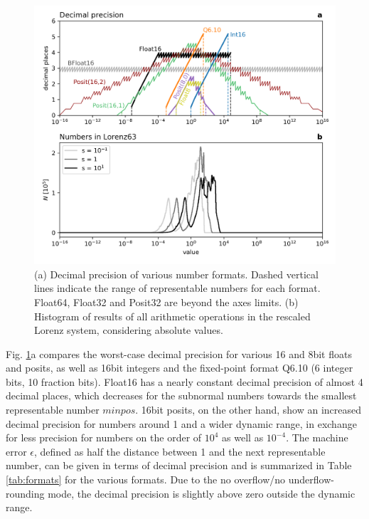 \documentclass[draft]{agujournal2019}
\begin{document}
\begin{figure}[htbp]
\includegraphics[width=1\textwidth]{../plots/decimal_precision.png}
\caption{(a) Decimal precision of various number formats. Dashed vertical lines indicate the range of representable numbers for each format. Float64, Float32 and Posit32 are beyond the axes limits. (b) Histogram of results of all arithmetic operations in the rescaled Lorenz system, considering absolute values.}
\label{fig:dec_acc}
\end{figure}

Fig. \ref{fig:dec_acc}a compares the worst-case decimal precision for various 16 and 8bit floats and posits, as well as 16bit integers and the fixed-point format Q6.10 (6 integer bits, 10 fraction bits). Float16 has a nearly constant decimal precision of almost 4 decimal places, which decreases for the subnormal numbers towards the smallest representable number $minpos$. 16bit posits, on the other hand, show an increased decimal precision for numbers around 1 and a wider dynamic range, in exchange for less precision for numbers on the order of $10^4$ as well as $10^{-4}$.  The machine error $\epsilon$, defined as half the distance between 1 and the next representable number, can be given in terms of decimal precision and is summarized in Table \ref{tab:formats} for the various formats. Due to the no overflow/no underflow-rounding mode, the decimal precision is slightly above zero outside the dynamic range. 
\end{document}
